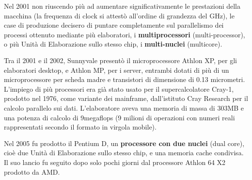 \documentclass[12pt]{article} %
\begin{document}
Nel 2001 non riuscendo più ad aumentare significativamente le prestazioni della macchina (la frequenza di clock si attestò all’ordine di grandezza del GHz), le case di produzione decisero di puntare completamente sul parallelismo dei processi ottenuto mediante più elaboratori, i \textbf{multiprocessori} (multi-processor), o più Unità di Elaborazione sullo stesso chip, i\textbf{ multi-nuclei }(multicore).\par\medskip\noindent
Tra il 2001 e il 2002, Sunnyvale presentò il microprocessore Athlon XP, per gli elaboratori desktop, e Athlon MP, per i server, entrambi dotati di più di un microprocessore per scheda madre e transistori di dimensione di 0.13 micrometri. L’impiego di più processori era già stato usato per il supercalcolatore Cray-1, prodotto nel 1976, come variante dei mainframe, dall’istituto Cray Research per il calcolo parallelo sui dati. L’elaboratore aveva una memoria di massa di 303MB e una potenza di calcolo di 9megaflops (9 milioni di operazioni con numeri reali rappresentati secondo il formato in virgola mobile).\par\medskip\noindent
Nel 2005 fu prodotto il Pentium D, un \textbf{processore con due nuclei} (dual core), cioè due Unità di Elaborazione sullo stesso chip, e una memoria cache condivisa. Il suo lancio fu seguito dopo solo pochi giorni dal processore Athlon 64 X2 prodotto da AMD.\par\medskip\noindent
\par\medskip\noindent
\end{document}
